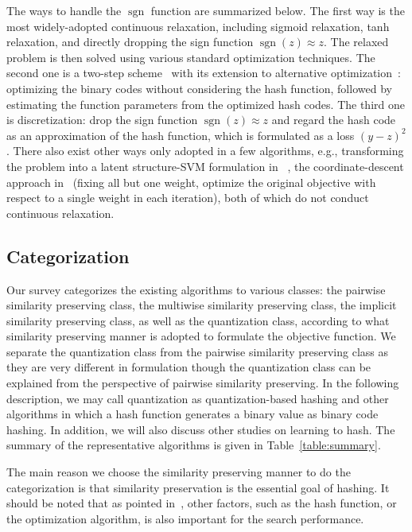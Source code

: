 \documentclass[10pt,journal,compsoc]{IEEEtran}
\begin{document}
The ways
to handle
the $\operatorname{sgn}$ function
are summarized below.
The first way is the most widely-adopted continuous relaxation,
including sigmoid relaxation, tanh relaxation,
and directly dropping the sign function
$\operatorname{sgn}(z) \approx z$.
The relaxed problem is then solved
using various standard optimization techniques.
The second one is a two-step scheme~\cite{LinSSH13, LinSSHS14}
with its extension to alternative optimization~\cite{GeH014}:
optimizing the binary codes without considering the hash function,
followed by estimating the function parameters
from the optimized hash codes.
The third one is discretization:
drop the sign function
$\operatorname{sgn}(z) \approx z$
and regard the hash code as an approximation
of the hash function,
which is formulated as a loss $(y-z)^2$.
There also exist other ways only adopted in a few algorithms,
e.g., transforming the problem into a latent structure-SVM formulation in~\cite{NorouziF11, NorouziFS12} ,
the coordinate-descent approach in~\cite{KulisD09}
(fixing all but one weight,
optimize the original objective with respect to a single weight in each iteration),
both of which do not conduct continuous relaxation.


\subsection{Categorization}
Our survey categorizes the existing algorithms
to various classes:
the pairwise similarity preserving class,
the multiwise similarity preserving class,
the implicit similarity preserving class,
as well as the quantization class,
according to what similarity preserving manner is adopted
to formulate the objective function.
We separate the quantization class
from the pairwise similarity preserving class
as they are very different in formulation
though
the quantization class can be explained
from the perspective of
pairwise similarity preserving.
In the following description,
we may call quantization as quantization-based hashing
and other algorithms in which a hash function
generates a binary value
as binary code hashing.
In addition,
we will also discuss other studies on learning to hash.
The summary of the representative algorithms
is given in Table~\ref{table:summary}.

The main reason we choose the similarity preserving manner
to do the categorization
is that similarity preservation is the essential goal
of hashing.
It should be noted that
as pointed in~\cite{WangLKC16, WangSSJ14},
other factors, such as the hash function,
or the optimization algorithm,
is also important
for the search performance.
\end{document}
